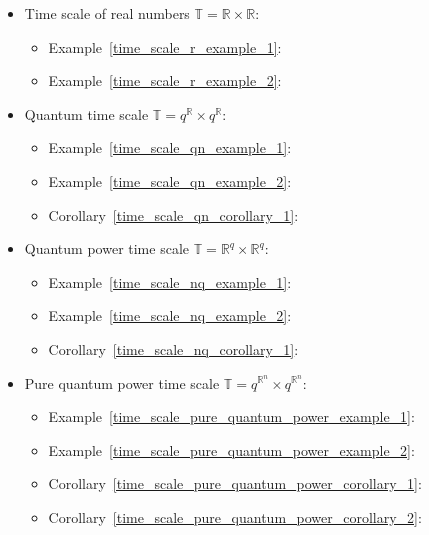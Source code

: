 \begin{itemize}
\begin{itemize}
    \end{itemize}
    \item Time scale of real numbers $\mathbb{T} = \mathbb{R} \times \mathbb{R}$:
    \begin{itemize}
        \item Example~\ref{time_scale_r_example_1}:
        \item Example~\ref{time_scale_r_example_2}:
    \end{itemize}
    \item Quantum time scale $\mathbb{T} = q^\mathbb{R} \times q^\mathbb{R}$:
    \begin{itemize}
        \item Example~\ref{time_scale_qn_example_1}:
        \item Example~\ref{time_scale_qn_example_2}:
        \item Corollary~\ref{time_scale_qn_corollary_1}:
    \end{itemize}
    \item Quantum power time scale $\mathbb{T} = \mathbb{R}^q \times \mathbb{R}^q$:
    \begin{itemize}
        \item Example~\ref{time_scale_nq_example_1}:
        \item Example~\ref{time_scale_nq_example_2}:
        \item Corollary~\ref{time_scale_nq_corollary_1}:
    \end{itemize}
    \item Pure quantum power time scale $\mathbb{T} = q^{\mathbb{R}^n} \times q^{\mathbb{R}^n}$:
    \begin{itemize}
        \item Example~\ref{time_scale_pure_quantum_power_example_1}:
        \item Example~\ref{time_scale_pure_quantum_power_example_2}:
        \item Corollary~\ref{time_scale_pure_quantum_power_corollary_1}:
        \item Corollary~\ref{time_scale_pure_quantum_power_corollary_2}:
    \end{itemize}
\end{itemize}
